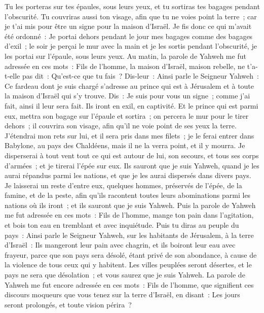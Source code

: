 \begin{multicols}{2}
Tu les porteras sur tes épaules, sous leurs yeux, et tu sortiras tes bagages pendant l'obscurité. Tu couvriras aussi ton visage, afin que tu ne voies point la terre~; car je t'ai mis pour être un signe pour la maison d'Israël.
Je fis donc ce qui m'avait été ordonné~: Je portai dehors pendant le jour mes bagages comme des bagages d'exil~; le soir je perçai le mur avec la main et je les sortis pendant l'obscurité, je les portai sur l'épaule, sous leurs yeux.
Au matin, la parole de Yahweh me fut adressée en ces mots~:
Fils de l'homme, la maison d'Israël, maison rebelle, ne t'a-t-elle pas dit~: Qu'est-ce que tu fais~?
Dis-leur~: Ainsi parle le Seigneur Yahweh~: Ce fardeau dont je suis chargé s'adresse au prince qui est à Jérusalem et à toute la maison d'Israël qui s'y trouve.
Dis~: Je suis pour vous un signe~; comme j'ai fait, ainsi il leur sera fait. Ils iront en exil, en captivité.
Et le prince qui est parmi eux, mettra son bagage sur l'épaule et sortira~; on percera le mur pour le tirer dehors~; il couvrira son visage, afin qu'il ne voie point de ses yeux la terre.
J'étendrai mon rets sur lui, et il sera pris dans mes filets~; je le ferai entrer dans Babylone, au pays des Chaldéens, mais il ne la verra point, et il y mourra.
Je disperserai à tout vent tout ce qui est autour de lui, son secours, et tous ses corps d'armées~; et je tirerai l'épée sur eux.
Ils sauront que je suis Yahweh, quand je les aurai répandus parmi les nations, et que je les aurai dispersés dans divers pays.
Je laisserai un reste d'entre eux, quelques hommes, préservés de l'épée, de la famine, et de la peste, afin qu'ils racontent toutes leurs abominations parmi les nations où ils iront~; et ils sauront que je suis Yahweh.
Puis la parole de Yahweh me fut adressée en ces mots~:
Fils de l'homme, mange ton pain dans l'agitation, et bois ton eau en tremblant et avec inquiétude.
Puis tu diras au peuple du pays~: Ainsi parle le Seigneur Yahweh, sur les habitants de Jérusalem, à la terre d'Israël~: Ils mangeront leur pain avec chagrin, et ils boiront leur eau avec frayeur, parce que son pays sera désolé, étant privé de son abondance, à cause de la violence de tous ceux qui y habitent.
Les villes peuplées seront désertes, et le pays ne sera que désolation~; et vous saurez que je suis Yahweh.
La parole de Yahweh me fut encore adressée en ces mots~:
Fils de l'homme, que signifient ces discours moqueurs que vous tenez sur la terre d'Israël, en disant~: Les jours seront prolongés, et toute vision périra~?

\end{multicols}
